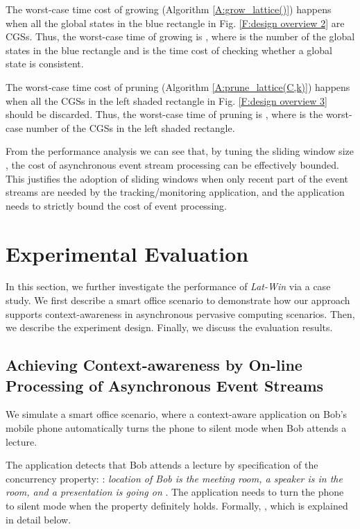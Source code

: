 \documentclass[12pt,journal,letterpaper,compsoc]{IEEEtran}
\begin{document}
The worst-case time cost of growing (Algorithm \ref{A:grow_lattice()}) happens when all the global states in the blue rectangle in Fig. \ref{F:design overview 2} are CGSs. Thus, the worst-case time of growing is , where  is the number of the global states in the blue rectangle and  is the time cost of checking whether a global state is consistent.

The worst-case time cost of pruning (Algorithm \ref{A:prune_lattice(C,k)}) happens when all the CGSs in the left shaded rectangle in Fig. \ref{F:design overview 3} should be discarded. Thus, the worst-case time of pruning is , where  is the worst-case number of the CGSs in the left shaded rectangle.

From the performance analysis we can see that, by tuning the sliding window size , the cost of asynchronous event stream processing can be effectively bounded. This justifies the adoption of sliding windows when only recent part of the event streams are needed by the tracking/monitoring application, and the application needs to strictly bound the cost of event processing.

\section{Experimental Evaluation}
\label{sec:evaluation}

In this section, we further investigate the performance of {\it Lat-Win} via a case study. We first describe a smart office scenario to demonstrate how our approach supports context-awareness in asynchronous pervasive computing scenarios. Then, we describe the experiment design. Finally, we discuss the evaluation results.

\subsection{Achieving Context-awareness by On-line Processing of Asynchronous Event Streams}

We simulate a smart office scenario, where a context-aware application on Bob's mobile phone automatically turns the phone to silent mode when Bob attends a lecture\cite{Huang11}.

The application detects that Bob attends a lecture by specification of the concurrency property: : {\it location of Bob is the meeting room, a speaker is in the room, and a presentation is going on} \cite{Huang11}. The application needs to turn the phone to silent mode when the property definitely holds. Formally, , which is explained in detail below.
\end{document}
